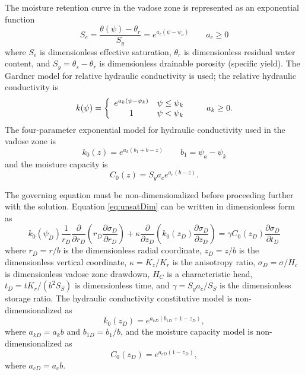 \documentclass[12pt,letterpaper]{article}
\begin{document}
The moisture retention curve in the vadose zone is represented as an exponential function
\begin{equation}\nonumber
S_e = \frac{\theta(\psi) - \theta_r}{S_y} = e^{a_c \left( \psi - \psi_a \right)} \qquad a_c \ge 0 
\end{equation}
where $S_e$ is dimensionless effective saturation, $\theta_r$ is dimensionless residual water content, and $S_y=\theta_s - \theta_r$ is dimensionless drainable porosity (specific yield).  The Gardner model for relative hydraulic conductivity is used; the relative hydraulic conductivity is
\begin{equation}
  \nonumber
  k(\psi) = \left  \{ 
    \begin{array}{c c}
      e^{a_k \left( \psi - \psi_k\right)} & \psi \le \psi_k \\
      1 & \psi < \psi_k\\
    \end{array} 
\right . \qquad a_k \ge 0.
\end{equation}
The four-parameter exponential model for hydraulic conductivity used in the vadose zone is 
\begin{equation}
  \label{eq:Gardner}
 k_0(z)=e^{a_k\left( b_1 + b - z\right)} \qquad b_1=\psi_a-\psi_k
\end{equation}
and the moisture capacity is
\begin{equation}
  \label{eq:mrc}
C_0(z) = S_y a_c e^{a_c \left( b-z\right)}.
\end{equation}

The governing equation  must be non-dimensionalized before proceeding further with the solution. Equation \eqref{eq:unsatDim} can be written in dimensionless form as
\begin{equation}
  \label{eq:unsatDimless}
  k_0(\psi_D) \frac{1}{r_D} \frac{\partial}{\partial r_D} \left( r_D\frac{\partial \sigma_D}{\partial r_D} \right) + \kappa \frac{\partial}{\partial z_D} \left( k_0(z_D) \frac{\partial \sigma_D}{\partial z_D}\right) = \gamma C_0(z_D) \frac{\partial \sigma_D}{\partial t_D}
\end{equation}
where $r_D=r/b$ is the dimensionless radial coordinate, $z_D=z/b$ is the dimensionless vertical coordinate, $\kappa=K_z/K_r$ is the anisotropy ratio, $\sigma_D = \sigma/H_c$ is dimensionless vadose zone drawdown, $H_C$ is a characteristic head, $t_D = t K_r / (b^2 S_S)$ is dimensionless time, and $\gamma = S_y a_c/S_S$ is the dimensionless storage ratio.  The hydraulic conductivity constitutive model is non-dimensionalized as
\begin{equation}
  \label{eq:GardnerDimless}
 k_0(z_D)=e^{a_{kD} \left( b_{1D} + 1 - z_D \right)},
\end{equation}
where $a_{kD} = a_k b$ and $b_{1D}=b_1/b$, and the moisture capacity model is non-dimensionalized as
\begin{equation}
  \label{eq:mrcDimless}
C_0(z_D) = e^{a_{cD} \left( 1-z_D\right)},
\end{equation}
where $a_{cD} = a_c b$.
\end{document}
